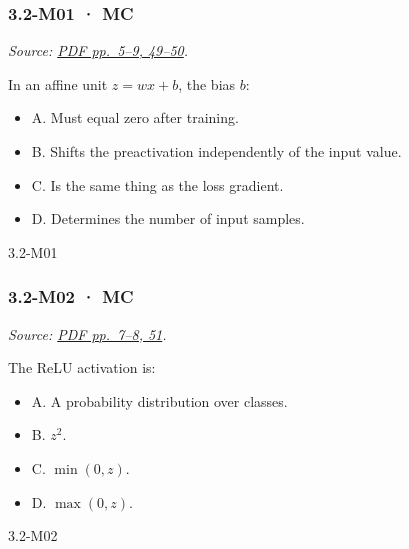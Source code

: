 \noindent\begin{minipage}{\linewidth}

\subsubsection{3.2-M01 · MC}\label{m01-mc-8}

\emph{Source:
\href{../Lecture\%20Slides/3.2.\%20Shallow\%20NN.pdf\#page=5}{PDF
pp.~5--9, 49--50}.}

In an affine unit \(z=wx+b\), the bias \(b\):

\begin{itemize}
\tightlist
\item
  A. Must equal zero after training.
\item
  B. Shifts the preactivation independently of the input value.
\item
  C. Is the same thing as the loss gradient.
\item
  D. Determines the number of input samples.
\end{itemize}

\begin{solution}[8mm]{3.2-M01}

\end{solution}
\end{minipage}\par\medskip

\noindent\begin{minipage}{\linewidth}

\subsubsection{3.2-M02 · MC}\label{m02-mc-8}

\emph{Source:
\href{../Lecture\%20Slides/3.2.\%20Shallow\%20NN.pdf\#page=7}{PDF
pp.~7--8, 51}.}

The ReLU activation is:

\begin{itemize}
\tightlist
\item
  A. A probability distribution over classes.
\item
  B. \(z^2\).
\item
  C. \(\min(0,z)\).
\item
  D. \(\max(0,z)\).
\end{itemize}

\begin{solution}[8mm]{3.2-M02}

\end{solution}
\end{minipage}\par\medskip

